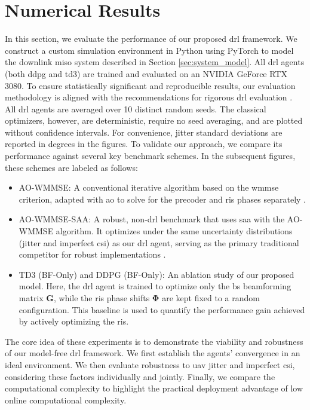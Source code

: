 \documentclass[letterpaper,journal]{IEEEtran}
\begin{document}
\section{Numerical Results}
\label{sec:results}
In this section, we evaluate the performance of our proposed \gls{drl} framework. We construct a custom simulation environment in Python using PyTorch to model the downlink \gls{miso} system described in Section \ref{sec:system_model}. All \gls{drl} agents (both \gls{ddpg} and \gls{td3}) are trained and evaluated on an NVIDIA GeForce RTX 3080. To ensure statistically significant and reproducible results, our evaluation methodology is aligned with the recommendations for rigorous \gls{drl} evaluation \cite{henderson2018deep}. All \gls{drl} agents are averaged over 10 distinct random seeds. The classical optimizers, however, are deterministic, require no seed averaging, and are plotted without confidence intervals. For convenience, jitter standard deviations are reported in degrees in the figures.
\noindent To validate our approach, we compare its performance against several key benchmark schemes. In the subsequent figures, these schemes are labeled as follows:
\begin{itemize}
    \item AO-WMMSE: A conventional iterative algorithm based on the \gls{wmmse} criterion, adapted with \gls{ao} to solve for the precoder and \gls{ris} phases separately \cite{shi2011iteratively}.
    \item AO-WMMSE-SAA: A robust, non-\gls{drl} benchmark that uses \gls{saa} with the AO-WMMSE algorithm. It optimizes under the same uncertainty distributions (jitter and imperfect \gls{csi}) as our \gls{drl} agent, serving as the primary traditional competitor for robust implementations \cite{Kim2011SAA}.
    \item TD3 (BF-Only) and DDPG (BF-Only): An ablation study of our proposed model. Here, the \gls{drl} agent is trained to optimize only the \gls{bs} beamforming matrix $\mathbf{G}$, while the \gls{ris} phase shifts $\boldsymbol{\Phi}$ are kept fixed to a random configuration. This baseline is used to quantify the performance gain achieved by actively optimizing the \gls{ris}.
\end{itemize}

\noindent The core idea of these experiments is to demonstrate the viability and robustness of our model-free \gls{drl} framework. We first establish the agents' convergence in an ideal environment. We then evaluate robustness to \gls{uav} jitter and imperfect \gls{csi}, considering these factors individually and jointly. Finally, we compare the computational complexity to highlight the practical deployment advantage of low online computational complexity.
\end{document}
